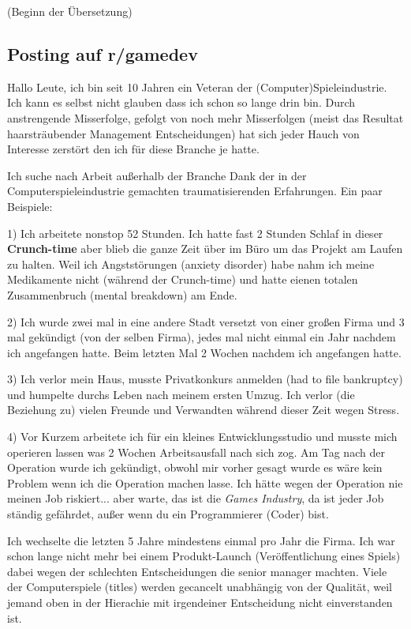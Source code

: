 \documentclass[10pt,a4paper,ngerman,twoside]{article} %
\begin{document}
\begin{multicols}{3}
(Beginn der Übersetzung)

\subsection*{Posting auf r/gamedev}
Hallo Leute,
ich bin seit 10 Jahren ein Veteran der (Computer)Spieleindustrie. Ich kann es selbst nicht glauben dass ich schon so lange drin bin. Durch anstrengende Misserfolge, gefolgt von noch mehr Misserfolgen (meist das Resultat haarsträubender Management Entscheidungen) hat sich jeder Hauch von Interesse zerstört den ich für diese Branche je hatte.

Ich suche nach Arbeit außerhalb der Branche Dank der in der Computerspieleindustrie gemachten traumatisierenden Erfahrungen. Ein paar Beispiele:

1) Ich arbeitete nonstop 52 Stunden. Ich hatte fast 2 Stunden Schlaf in dieser \textbf{Crunch-time} aber blieb die ganze Zeit über im Büro um das Projekt am Laufen zu halten.   
Weil ich Angststörungen (anxiety disorder) habe nahm ich meine Medikamente nicht (während der Crunch-time) und hatte eienen totalen Zusammenbruch (mental breakdown) am Ende.

2) Ich wurde zwei mal in eine andere Stadt versetzt von einer großen Firma und 3 mal gekündigt (von der selben Firma), jedes mal nicht einmal ein Jahr nachdem ich angefangen hatte. Beim letzten Mal 2 Wochen nachdem ich angefangen hatte.

3) Ich verlor mein Haus, musste Privatkonkurs anmelden (had to file bankruptcy) und humpelte durchs Leben nach meinem ersten Umzug. Ich verlor (die Beziehung zu) vielen Freunde und Verwandten während dieser Zeit wegen Stress.

4) Vor Kurzem arbeitete ich für ein kleines Entwicklungsstudio und musste mich operieren lassen was 2 Wochen Arbeitsausfall nach sich zog. Am Tag nach der Operation wurde ich gekündigt, obwohl mir vorher gesagt wurde es wäre kein Problem wenn ich die Operation machen lasse. Ich hätte wegen der Operation nie meinen Job riskiert... aber warte, das ist die \textit{Games Industry}, da ist jeder Job ständig gefährdet, außer wenn du ein Programmierer (Coder) bist.

Ich wechselte die letzten 5 Jahre mindestens einmal pro Jahr die Firma. Ich war schon lange nicht mehr bei einem Produkt-Launch (Veröffentlichung eines Spiels) dabei wegen der schlechten Entscheidungen die senior manager machten. Viele der Computerspiele (titles) werden gecancelt unabhängig von der Qualität, weil jemand oben in der Hierachie mit irgendeiner Entscheidung nicht einverstanden ist.


\end{multicols}
\end{document}
